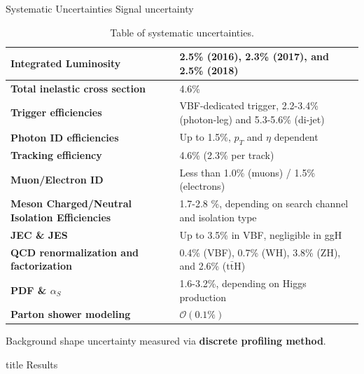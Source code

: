 \documentclass[9pt,aspectratio=1610]{beamer}
\newcommand{\pt}{\ensuremath{p_T}}
\begin{document}
\begin{frame}{Systematic Uncertainties}
	Signal uncertainty
	\begin{table}
		\small
		\begin{tabular}{l|l}
			\hline
			\textbf{Integrated Luminosity} & 2.5\% (2016), 2.3\% (2017), and 2.5\% (2018)\\
			\hline
			\textbf{Total inelastic cross section} & 4.6\%\\
			\hline
			\textbf{Trigger efficiencies} & VBF-dedicated trigger, 2.2-3.4\% (photon-leg)
			and 5.3-5.6\% (di-jet)\\
			\hline
			\textbf{Photon ID efficiencies} & Up to 1.5\%, \(\pt\) and \(\eta\) dependent\\
			\hline
			\textbf{Tracking efficiency} & 4.6\% (2.3\% per track)\\
			\hline
			\textbf{Muon/Electron ID} & Less than 1.0\% (muons) / 1.5\% (electrons)\\
			\hline
			\textbf{Meson Charged/Neutral Isolation Efficiencies} & 1.7-2.8 \%, depending on search channel and isolation type\\
			\hline
			\textbf{JEC \& JES} & Up to 3.5\% in VBF, negligible in ggH\\
			\hline
			\textbf{QCD renormalization and factorization} & 0.4\% (VBF), 0.7\% (WH), 3.8\% (ZH), and 2.6\% (\(\mathrm{t\bar{t}H}\))\\
			\hline
			\textbf{PDF \& \(\alpha_S\)} & 1.6-3.2\%, depending on Higgs production\\
			\hline
			\textbf{Parton shower modeling} & \(\mathcal{O}(0.1\%)\)\\
			\hline
		\end{tabular}
		\caption{Table of systematic uncertainties.}
	\end{table}

	Background shape uncertainty measured via \textbf{discrete profiling method}.
\end{frame}

\begin{frame}
	\label{sec:res}
	\vfill
	\centering
	\begin{beamercolorbox}[sep=8pt,center,shadow=false,rounded=true]{title}
		\Huge Results \par%
	\end{beamercolorbox}
	\vfill
\end{frame}
\end{document}
